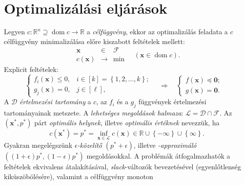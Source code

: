 \documentclass[DIV=15,appendixprefix]{scrreprt}
\theoremstyle{definition}
\theoremstyle{remark}
\DeclareMathOperator{\dom}{dom}
\begin{document}
\section{Optimalizálási eljárások}
%
Legyen $ c \colon \mathbb{ R }^{ n } \supseteq \dom c \rightarrow \mathbb{ R } $ a
\emph{célfüggvény}, ekkor az optimalizálás feladata a $ c $ célfüggvény minimalizálása előre
kiszabott feltételek mellett:
\begin{equation*}
	\begin{array}{rcl}
		\mathbf{ x }					&	\in			&	\mathcal{ F }\\
		\hline
		c \left( \mathbf{ x } \right)	&	\rightarrow	&	\min
	\end{array} \quad \left( \mathbf{ x } \in \dom c \right).
\end{equation*}
Explicit feltételek:
\begin{equation*}
	\begin{cases}
		f_{ i } \left( \mathbf{ x } \right) \le 0,	&	i \in \left[ k \right] = \left\{ 1,{} 2,{}
			\ldots,{} k \right\};\\
		g_{ j } \left( \mathbf{ x } \right) = 0,	&	j \in \left[ \ell \right],
	\end{cases} \quad \Rightarrow \quad \begin{cases}
		f \left( \mathbf{ x } \right) \preceq \mathbf{ 0 };	&\\
		g \left( \mathbf{ x } \right) = \mathbf{ 0 }.		&
	\end{cases}
\end{equation*}
A $ \mathcal{ D } $ \emph{értelmezési tartomány} a $ c $, az $ f_{ i } $ és a $ g_{ j } $ függvények
értelmezési tartományainak metszete. A \emph{lehetséges megoldások halmaza}: $ \mathcal{ L } =
\mathcal{ D } \cap \mathcal{ F } $. Az $ \left( \mathbf{ x }^{ * },{} p^{ * } \right) $ párt
\emph{optimális helynek}, illetve \emph{optimális értéknek} nevezzük, ha
\begin{equation*}
	c \left( \mathbf{ x }^{ * } \right) = p^{ * } = \inf_{ \mathbf{ x } \in \mathcal{ L } } c \left(
	\mathbf{ x } \right) \in \mathbb{ R } \cup \left\{ - \infty \right\} \cup \left\{ \infty
	\right\}.
\end{equation*}
Gyakran megelégszünk \emph{$ \epsilon $-közelítő} $ \left( p^{ * } + \epsilon \right) $, illetve
\emph{-approximáló} $ \left( \left( 1 + \epsilon \right) p^{ * },{} \left( 1 - \epsilon \right)
p^{ * } \right) $ megoldásokkal. A problémák átfogalmazhatók a feltételek ekvivalens átalakításával,
\emph{slack}-változók bevezetésével (egyenlőtlenség kiküszöbölésére), valamint a célfüggvény monoton
\end{document}
